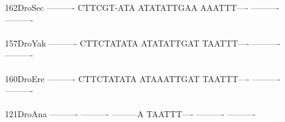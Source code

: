 \documentclass[11pt,twoside,reqno,a4paper]{article}
\begin{document}
{162\hspace*{2\charwidth}DroSec	----------	CTTCGT-ATA	ATATATTGAA	AAATTT----	----------	----------	\\
\hspace*{5\charwidth}\hspace*{7\charwidth}\hspace*{1\charwidth}\hspace*{1\charwidth}\hspace*{1\charwidth}\hspace*{1\charwidth}\hspace*{1\charwidth}\hspace*{1\charwidth}\\
157\hspace*{2\charwidth}DroYak	----------	CTTCTATATA	ATATATTGAT	TAATTT----	----------	----------	\\
\hspace*{5\charwidth}\hspace*{7\charwidth}\hspace*{1\charwidth}\hspace*{1\charwidth}\hspace*{1\charwidth}\hspace*{1\charwidth}\hspace*{1\charwidth}\hspace*{1\charwidth}\\
160\hspace*{2\charwidth}DroEre	----------	CTTCTATATA	ATAAATTGAT	TAATTT----	----------	----------	\\
\hspace*{5\charwidth}\hspace*{7\charwidth}\hspace*{1\charwidth}\hspace*{1\charwidth}\hspace*{1\charwidth}\hspace*{1\charwidth}\hspace*{1\charwidth}\hspace*{1\charwidth}\\
121\hspace*{2\charwidth}DroAna	----------	----------	---------A	TAATTT----	----------	----------	\\
\hspace*{5\charwidth}\hspace*{7\charwidth}\hspace*{1\charwidth}\hspace*{1\charwidth}\hspace*{1\charwidth}\hspace*{1\charwidth}\hspace*{1\charwidth}\hspace*{1\charwidth}\\
}
\end{document}
